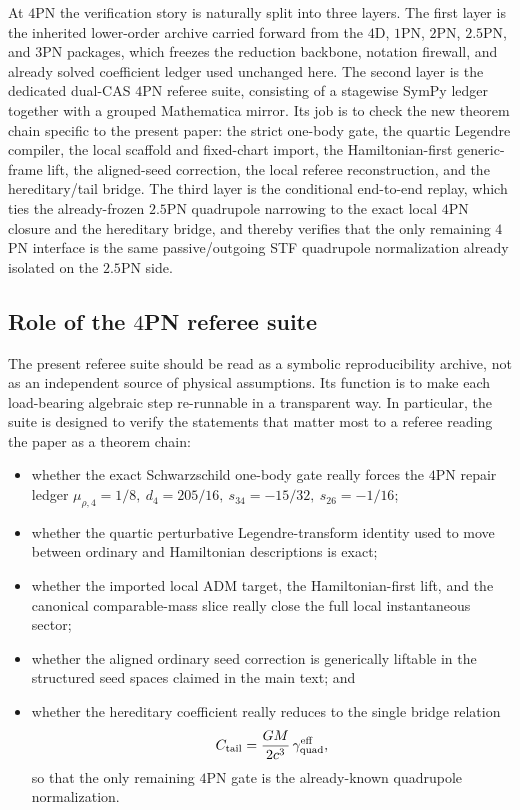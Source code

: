 \documentclass[11pt]{article}
\begin{document}
At $4$PN the verification story is naturally split into three layers.  The
first layer is the inherited lower-order archive carried forward from the $4$D,
$1$PN, $2$PN, $2.5$PN, and $3$PN packages, which freezes the reduction
backbone, notation firewall, and already solved coefficient ledger used
unchanged here.  The second layer is the dedicated dual-CAS $4$PN referee
suite, consisting of a stagewise SymPy ledger together with a grouped
Mathematica mirror.  Its job is to check the new theorem chain specific to the
present paper: the strict one-body gate, the quartic Legendre compiler, the
local scaffold and fixed-chart import, the Hamiltonian-first generic-frame
lift, the aligned-seed correction, the local referee reconstruction, and the
hereditary/tail bridge.  The third layer is the conditional end-to-end replay,
which ties the already-frozen $2.5$PN quadrupole narrowing to the exact local
$4$PN closure and the hereditary bridge, and thereby verifies that the only
remaining $4$PN interface is the same passive/outgoing STF quadrupole
normalization already isolated on the $2.5$PN side.

\subsection{Role of the \texorpdfstring{$4$}{4}PN referee suite}
\label{sec:verification-role}

The present referee suite should be read as a symbolic reproducibility archive,
not as an independent source of physical assumptions.  Its function is to make
each load-bearing algebraic step re-runnable in a transparent way.  In
particular, the suite is designed to verify the statements that matter most to
a referee reading the paper as a theorem chain:
\begin{itemize}
  \item whether the exact Schwarzschild one-body gate really forces the $4$PN
  repair ledger
  \(
  \mu_{\rho,4}=1/8,
  \ d_4=205/16,
  \ s_{34}=-15/32,
  \ s_{26}=-1/16
  \);
  \item whether the quartic perturbative Legendre-transform identity used to
  move between ordinary and Hamiltonian descriptions is exact;
  \item whether the imported local ADM target, the Hamiltonian-first lift, and
  the canonical comparable-mass slice really close the full local instantaneous
  sector;
  \item whether the aligned ordinary seed correction is generically liftable in
  the structured seed spaces claimed in the main text; and
  \item whether the hereditary coefficient really reduces to the single bridge
  relation
  \begin{equation}
  C_{\rm tail}=\frac{GM}{2c^3}\,\gamma_{\rm quad}^{\rm eff},
  \label{eq:verification-tail-bridge}
  \end{equation}
  so that the only remaining $4$PN gate is the already-known quadrupole
  normalization.
\end{itemize}
\end{document}
